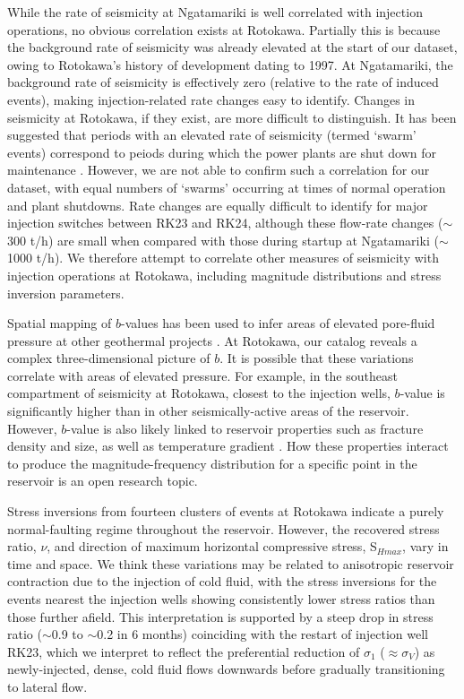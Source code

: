 While the rate of seismicity at Ngatamariki is well correlated with injection operations, no obvious correlation exists at Rotokawa. Partially this is because the background rate of seismicity was already elevated at the start of our dataset, owing to Rotokawa's history of development dating to 1997. At Ngatamariki, the background rate of seismicity is effectively zero (relative to the rate of induced events), making injection-related rate changes easy to identify. Changes in seismicity at Rotokawa, if they exist, are more difficult to distinguish. It has been suggested that periods with an elevated rate of seismicity (termed `swarm' events) correspond to peiods during which the power plants are shut down for maintenance \citep{Sewell_2015WGC}. However, we are not able to confirm such a correlation for our dataset, with equal numbers of `swarms' occurring at times of normal operation and plant shutdowns. Rate changes are equally difficult to identify for major injection switches between RK23 and RK24, although these flow-rate changes ($\sim$300 t/h) are small when compared with those during startup at Ngatamariki ($\sim$1000 t/h). We therefore attempt to correlate other measures of seismicity with injection operations at Rotokawa, including magnitude distributions and stress inversion parameters.

Spatial mapping of $b$-values has been used to infer areas of elevated pore-fluid pressure at other geothermal projects \citep[e.g.][]{Bachmann_2012}. At Rotokawa, our catalog reveals a complex three-dimensional picture of $b$. It is possible that these variations correlate with areas of elevated pressure. For example, in the southeast compartment of seismicity at Rotokawa, closest to the injection wells, $b$-value is significantly higher than in other seismically-active areas of the reservoir. However, $b$-value is also likely linked to reservoir properties such as fracture density and size, as well as temperature gradient \citep[e.g.][]{Wiemer_1998}. How these properties interact to produce the magnitude-frequency distribution for a specific point in the reservoir is an open research topic.

Stress inversions from fourteen clusters of events at Rotokawa indicate a purely normal-faulting regime throughout the reservoir. However, the recovered stress ratio, $\nu$, and direction of maximum horizontal compressive stress, S$_{Hmax}$, vary in time and space. We think these variations may be related to anisotropic reservoir contraction due to the injection of cold fluid, with the stress inversions for the events nearest the injection wells showing consistently lower stress ratios than those further afield. This interpretation is supported by a steep drop in stress ratio ($\sim$0.9 to $\sim$0.2 in 6 months) coinciding with the restart of injection well RK23, which we interpret to reflect the preferential reduction of $\sigma_{1}$ ($\approx{\sigma_{V}}$) as newly-injected, dense, cold fluid flows downwards before gradually transitioning to lateral flow.

